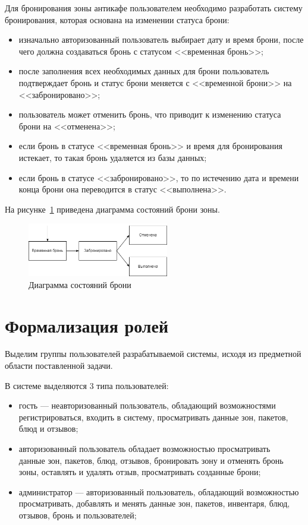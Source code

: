 Для бронирования зоны антикафе пользователем необходимо разработать систему бронирования, которая основана на изменении статуса брони:
\begin{itemize}
	\item изначально авторизованный пользователь выбирает дату и время брони, после чего должна создаваться бронь с статусом <<временная бронь>>;
	\item после заполнения всех необходимых данных для брони пользователь подтверждает бронь и статус брони меняется с <<временной брони>> на <<забронировано>>;
	\item пользователь может отменить бронь, что приводит к изменению статуса брони на <<отменена>>;
	\item если бронь в статусе <<временная бронь>> и время для бронирования истекает, то такая бронь удаляется из базы данных;
	\item если бронь в статусе <<забронировано>>, то по истечению дата и времени конца брони она переводится в статус <<выполнена>>.
\end{itemize}

\clearpage

На рисунке~\ref{fig:status-booking} приведена диаграмма состояний брони зоны.

\begin{figure}[h]
 	\centering
 	\includegraphics[width=0.55\textwidth]{img/status-booking.png}
 	\caption{Диаграмма состояний брони}
 	\label{fig:status-booking}
\end{figure}

\section{Формализация ролей}

Выделим группы пользователей разрабатываемой системы, исходя из предметной области поставленной задачи.

В системе выделяются 3 типа пользователей: 
\begin{itemize}
	\item гость --- неавторизованный пользователь, обладающий возможностями регистрироваться, входить в систему, просматривать данные зон, пакетов, блюд и отзывов;
	\item авторизованный пользователь обладает возможностью просматривать \\ данные зон, пакетов, блюд, отзывов, бронировать зону и отменять бронь зоны, оставлять и удалять отзыв, просматривать созданные брони;
	\item администратор --- авторизованный пользователь, обладающий возможностью просматривать, добавлять и менять данные зон, пакетов, инвентаря, блюд, отзывов, бронь и пользователей;
\end{itemize}


